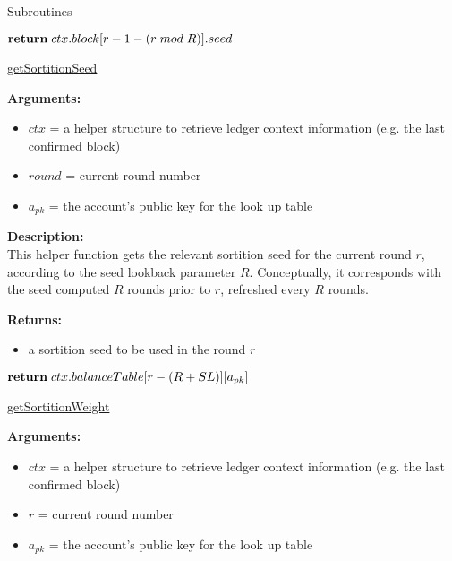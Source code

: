 \documentclass[10pt,a4paper]{article}
\begin{document}
\begin{section}{Subroutines}
\begin{algorithm}[H]
    \begin{algorithmic}[H]
        
            $\Return\;ctx.block[r-1-(r\;mod\;R)].seed$

        \EndFunction
    \end{algorithmic}
    \caption{\underline{getSortitionSeed}}
\end{algorithm}

\noindent \textbf{Arguments:}
\begin{itemize}
    \item $ctx$ = a helper structure to retrieve ledger context information (e.g. the last confirmed block)
    \item $round$ = current round number
    \item $a_{pk}$ = the account's public key for the look up table
  \end{itemize}


\noindent \textbf{Description:}\\
This helper function gets the relevant sortition seed for the current round $r$, according to the seed lookback parameter $R$.
Conceptually, it corresponds with the seed computed $R$ rounds prior to $r$, refreshed every $R$ rounds.

\noindent \textbf{Returns:}
\begin{itemize}
    \item a sortition seed to be used in the round $r$
  \end{itemize}


\begin{algorithm}[H]
    \begin{algorithmic}[H]

            $\Return\;ctx.balanceTable[r - (R + SL)][a_{pk}]$

        \EndFunction
    \end{algorithmic}
    \caption{\underline{getSortitionWeight}}
\end{algorithm}

\noindent \textbf{Arguments:}
\begin{itemize}
    \item $ctx$ = a helper structure to retrieve ledger context information (e.g. the last confirmed block)
    \item $r$ = current round number
    \item $a_{pk}$ = the account's public key for the look up table
  \end{itemize}



\end{section}
\end{document}
